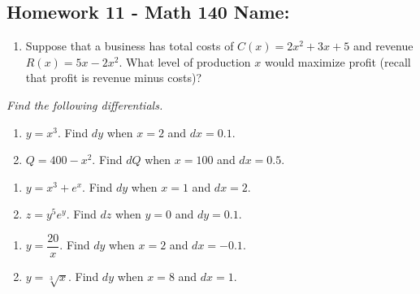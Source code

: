 \documentclass[10pt]{article}
\begin{document}
\pagestyle{empty}
\subsection*{Homework 11 - Math 140 \hfill Name: \underline{\hspace*{2in}}}

\noindent

\begin{enumerate}
\item  Suppose that a business has total costs of $C(x) = 2x^2 + 3x + 5$ and revenue $R(x) = 5x-2x^2$. What level of production $x$ would maximize profit (recall that profit is revenue minus costs)?
\vfill

\setcounter{enumCount}{\theenumi}
\end{enumerate}

\noindent
\textit{Find the following differentials.}

\begin{multicols}{2}
\begin{enumerate}
\setcounter{enumi}{\theenumCount}
\item $y = x^3$. Find $dy$ when $x = 2$ and $dx = 0.1$.


\item $Q = 400 - x^2$.  Find $dQ$ when $x = 100$ and $dx = 0.5$.

\setcounter{enumCount}{\theenumi}
\end{enumerate} 
\end{multicols}

\vfill

\begin{multicols}{2}
\begin{enumerate}
\setcounter{enumi}{\theenumCount}
\item $y = x^3 + e^x$.  Find $dy$ when $x = 1$ and $dx = 2$. 


\item $z = y^5 e^y$.  
Find $dz$ when $y = 0$ and $dy = 0.1$.  

\setcounter{enumCount}{\theenumi}
\end{enumerate} 
\end{multicols}

\vfill


\begin{multicols}{2}
\begin{enumerate}
\setcounter{enumi}{\theenumCount}
\item $y = \dfrac{20}{x}$.  Find $dy$ when $x = 2$ and $dx = -0.1$. 


\item $y = \sqrt[3]{x}$.  Find $dy$ when $x = 8$ and $dx = 1$.  

\setcounter{enumCount}{\theenumi}
\end{enumerate} 
\end{multicols}
\end{document}
